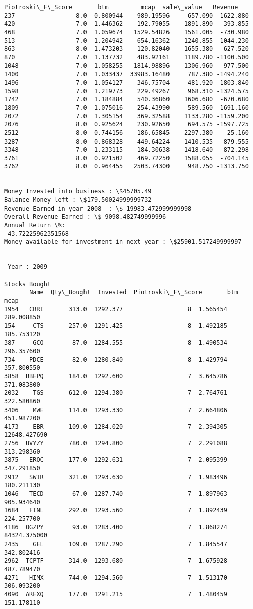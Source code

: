 \documentclass[11pt]{article}
\begin{document}
\begin{Verbatim}[commandchars=\\\{\}]
      Piotroski\_F\_Score       btm         mcap  sale\_value   Revenue
237                 8.0  0.800944    989.19596     657.090 -1622.880
420                 7.0  1.446362    192.79055    1891.890  -393.855
468                 7.0  1.059674   1529.54826    1561.005  -730.980
513                 7.0  1.204942    654.16362    1240.855 -1044.230
863                 8.0  1.473203    120.82040    1655.380  -627.520
870                 7.0  1.137732    483.92161    1189.780 -1100.500
1048                7.0  1.058255   1814.98896    1306.960  -977.500
1400                7.0  1.033437  33983.16480     787.380 -1494.240
1496                7.0  1.054127    346.75704     481.920 -1803.840
1598                7.0  1.219773    229.49267     968.310 -1324.575
1742                7.0  1.184884    540.36860    1606.680  -670.680
1809                7.0  1.075016    254.43990     589.560 -1691.160
2072                7.0  1.305154    369.32588    1133.280 -1159.200
2076                8.0  0.925624    230.92650     694.575 -1597.725
2512                8.0  0.744156    186.65845    2297.380    25.160
3287                8.0  0.868328    449.64224    1410.535  -879.555
3348                7.0  1.233115    184.30638    1418.640  -872.298
3761                8.0  0.921502    469.72250    1588.055  -704.145
3762                8.0  0.964455   2503.74300     948.750 -1313.750


Money Invested into business : \$45705.49
Balance Money left : \$179.50024999999732
Revenue Earned in year 2008  : \$-19983.472999999998
Overall Revenue Earned : \$-9098.482749999996
Annual Return \%:
-43.72225962351568
Money available for investment in next year : \$25901.517249999997


 Year : 2009

Stocks Bought
       Name  Qty\_Bought  Invested  Piotroski\_F\_Score       btm          mcap
1954   CBRI       313.0  1292.377                  8  1.565454    289.008850
154     CTS       257.0  1291.425                  8  1.492185    185.753120
387     GCO        87.0  1284.555                  8  1.490534    296.357600
734    PDCE        82.0  1280.840                  8  1.429794    357.800550
3858  BBEPQ       184.0  1292.600                  7  3.645786    371.083800
2032    TGS       612.0  1294.380                  7  2.764761    322.580860
3406    MWE       114.0  1293.330                  7  2.664806    451.987200
4173    EBR       109.0  1284.020                  7  2.394305  12648.427690
2756  UVYZY       780.0  1294.800                  7  2.291088    313.298360
3875   EROC       177.0  1292.631                  7  2.095399    347.291850
2912   SWIR       321.0  1293.630                  7  1.983496    180.211130
1046   TECD        67.0  1287.740                  7  1.897963    905.934640
1684   FINL       292.0  1293.560                  7  1.892439    224.257700
4186  OGZPY        93.0  1283.400                  7  1.868274  84324.375000
2435    GEL       109.0  1287.290                  7  1.845547    342.802416
2962  TCPTF       314.0  1293.680                  7  1.675928    487.789470
4271   HIMX       744.0  1294.560                  7  1.513170    306.093200
4090  AREXQ       177.0  1291.215                  7  1.480459    151.178110


\end{Verbatim}
\end{document}
